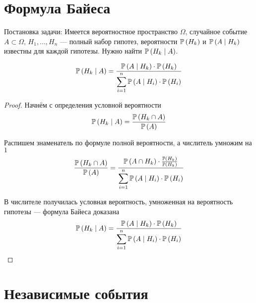 \section{Формула Байеса}
Постановка задачи: Имеется вероятностное пространство $\Omega$,
случайное событие $A\subset\Omega$,
$H_1,\dots,H_n$ --- полный набор гипотез,
вероятности $\mathbb{P}\left( H_k \right)$ и $\mathbb{P}\left( A\mid H_k \right)$ известны
для каждой гипотезы. Нужно найти $\mathbb{P}\left( H_k\mid A \right)$.
\begin{lemma}
    $$\mathbb{P}\left( H_k\mid A \right)
    =\frac{\mathbb{P}\left( A\mid H_k \right)\cdot\mathbb{P}\left( H_k \right)}
    {\displaystyle\sum_{i=1}^n \mathbb{P}\left( A\mid H_i \right)\cdot\mathbb{P}\left( H_i \right)}
    $$
\end{lemma}
\begin{proof}
    Начнём с определения условной вероятности
    $$\mathbb{P}\left( H_k\mid A \right)
    =\frac{\mathbb{P}\left( H_k\cap A \right)}{\mathbb{P}\left( A \right)}
    $$
    
    Распишем знаменатель по формуле полной вероятности,
    а числитель умножим на $1$
    $$
    \frac{\mathbb{P}\left( H_k\cap A \right)}{\mathbb{P}\left( A \right)}
    =\frac{\mathbb{P}\left( A\cap H_k \right)\cdot
    \frac{\mathbb{P}\left( H_k \right)}{\mathbb{P}\left( H_k \right)}}
    {\displaystyle\sum_{i=1}^n \mathbb{P}\left( A\mid H_i \right)\cdot\mathbb{P}\left( H_i \right)}
    $$

    В числителе получилась условная вероятность,
    умноженная на вероятность гипотезы --- формула Байеса доказана
    $$\mathbb{P}\left( H_k\mid A \right)
    =\frac{\mathbb{P}\left( A\mid H_k \right)\cdot\mathbb{P}\left( H_k \right)}
    {\displaystyle\sum_{i=1}^n \mathbb{P}\left( A\mid H_i \right)\cdot\mathbb{P}\left( H_i \right)}
    $$
\end{proof}

\section{Независимые события}
